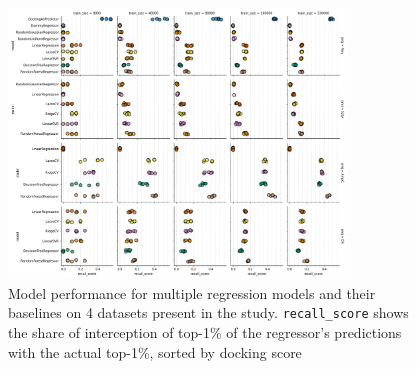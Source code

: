 



\begin{figure}[h]
\centering
\includegraphics[width=0.8\textwidth]{figures/Figure_4.png}
\caption{Model performance for multiple regression models and their baselines on 4 datasets present in the study. \texttt{recall\_score} shows the share of interception of top-1\% of the regressor's predictions with the actual top-1\%, sorted by docking score}
\label{fig:fig_4}
\end{figure}


